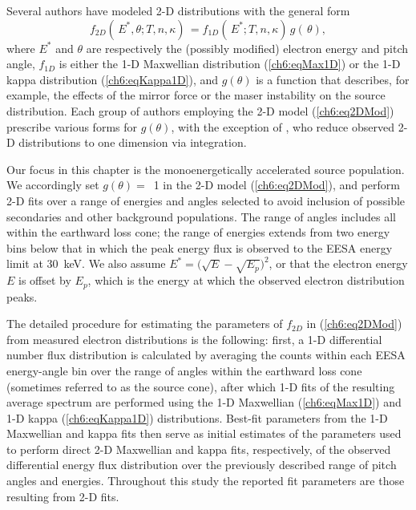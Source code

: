   Several authors \citep{Maggs1981,Bingham1999,Bingham2000,Mutel2007} have
  modeled 2-D distributions with the general form
    \begin{equation} \label{ch6:eq2DMod} f_{2D}(\, E^*, \theta ; T, n,
      \kappa) \, = f_{1D}(\, E^*; T, n, \kappa) \, g(\, \theta),
    \end{equation}
  where $E^*$ and $\theta$ are respectively the (possibly modified) electron
  energy and pitch angle, $f_{1D}$ is either the 1-D Maxwellian distribution
  (\ref{ch6:eqMax1D}) or the 1-D kappa distribution (\ref{ch6:eqKappa1D}), and
  $g(\theta )$ is a function that describes, for example, the effects of the
  mirror force or the maser instability on the source distribution. Each group
  of authors employing the 2-D model (\ref{ch6:eq2DMod}) prescribe various forms
  for $g(\theta)$, with the exception of \citet{Pritchett1999}, who reduce
  observed 2-D distributions to one dimension via integration.

  Our focus in this chapter is the monoenergetically accelerated source
  population. We accordingly set $g(\theta) =$~1 in the 2-D model
  (\ref{ch6:eq2DMod}), and perform 2-D fits over a range of energies and angles
  selected to avoid inclusion of possible secondaries and other background
  populations. The range of angles includes all within the earthward loss cone;
  the range of energies extends from two energy bins below that in which the
  peak energy flux is observed to the EESA energy limit at 30~keV. We also
  assume $E^* = \big( \sqrt{E} - \sqrt{E_p} \big)^2$, or that the electron
  energy $E$ is offset by $E_p$, which is the energy at which the observed
  electron distribution peaks.

  The detailed procedure for estimating the parameters of $f_{2D}$ in
  (\ref{ch6:eq2DMod}) from measured electron distributions is the following:
  first, a 1-D differential number flux distribution is calculated by averaging
  the counts within each EESA energy-angle bin over the range of angles within
  the earthward loss cone (sometimes referred to as the source cone), after
  which 1-D fits of the resulting average spectrum are performed using the 1-D
  Maxwellian (\ref{ch6:eqMax1D}) and 1-D kappa (\ref{ch6:eqKappa1D})
  distributions. Best-fit parameters from the 1-D Maxwellian and kappa fits then
  serve as initial estimates of the parameters used to perform direct 2-D
  Maxwellian and kappa fits, respectively, of the observed differential energy
  flux distribution over the previously described range of pitch angles and
  energies. Throughout this study the reported fit parameters are those
  resulting from 2-D fits.

